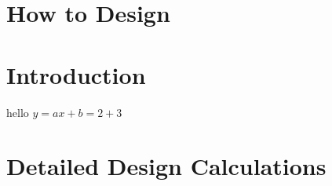 \documentclass[12pt,twoside,a4paper,openany]{report}
\begin{document}
%

\section{How to Design}

\clearpage
\section{Introduction}
hello \( y = ax + b = 2 + 3\)


\clearpage
\section{Detailed Design Calculations}


\clearpage
\renewcommand{\chapter}{\section}
\renewcommand{\thechapter}{} %
\renewcommand{\bibname}{References}  %
\end{document}
